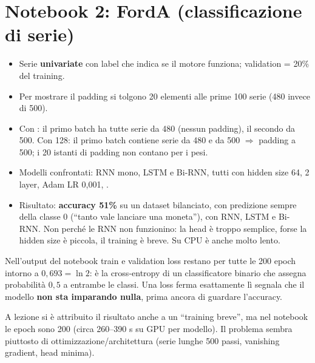 \section{Notebook 2: FordA (classificazione di serie)}
\begin{itemize}
  \item Serie \textbf{univariate} con label che indica se il motore funziona; validation = 20\% del training.
  \item Per mostrare il padding si tolgono 20 elementi alle prime 100 serie (480 invece di 500).
  \item Con : il primo batch ha tutte serie da 480 (nessun padding), il secondo da 500.
        Con 128: il primo batch contiene serie da 480 e da 500 $\Rightarrow$ padding a 500; i 20 istanti di padding non contano
        per i pesi.
  \item Modelli confrontati: RNN mono, LSTM e Bi-RNN, tutti con hidden size 64, 2 layer, Adam LR 0,001, .
  \item Risultato: \textbf{accuracy 51\%} su un dataset bilanciato, con predizione sempre della classe 0 (``tanto vale lanciare una moneta''),
        con RNN, LSTM e Bi-RNN. Non perché le RNN non funzionino: la head è troppo semplice, forse la hidden size è piccola, il
        training è breve. Su CPU è anche molto lento.
\end{itemize}
\begin{integrazione}
Nell'output del notebook train e validation loss restano per tutte le 200 epoch intorno a $0{,}693 = \ln 2$: è la cross-entropy di un
classificatore binario che assegna probabilità $0{,}5$ a entrambe le classi. Una loss ferma esattamente lì segnala che il modello
\textbf{non sta imparando nulla}, prima ancora di guardare l'accuracy.
\end{integrazione}
\begin{verifica}
A lezione si è attribuito il risultato anche a un ``training breve'', ma nel notebook le epoch sono 200 (circa 260--390 s su GPU per
modello). Il problema sembra piuttosto di ottimizzazione/architettura (serie lunghe 500 passi, vanishing gradient, head minima).
\end{verifica}

